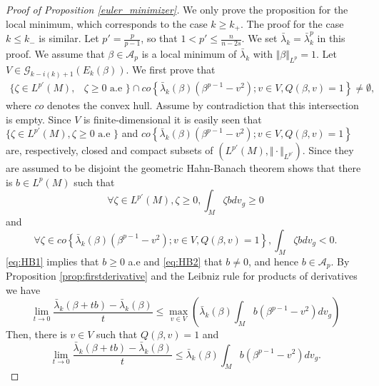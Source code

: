 \documentclass[10pt]{amsart}
\numberwithin{equation}{section}
\theoremstyle{plain}
\theoremstyle{remark}
\begin{document}
\begin{proof}[Proof of Proposition \ref{euler_minimizer}] We only prove the proposition for the local minimum, which corresponds to the case $k \ge k_+$.  The proof for the case $k \le k_{-}$ is similar. Let $p'= \frac{p}{p-1}$, so that $1 <p' \le \frac{n}{n-2s}$. We set $\bar{\lambda}_k = \bar{\lambda}_k^p$ in this proof.  We assume that $\beta \in \mathcal{A}_p$ is a local minimum of $\bar{\lambda}_k$ with $\Vert \beta \Vert_{L^p} = 1$. Let $V \in \mathcal{G}_{k-i(k)+1}(E_k(\beta))$. We first prove that
\begin{equation} \label{eq:HBnonempty}
\begin{split} \{ \zeta \in L^{p'}(M) , & \zeta \geq 0 \text{ a.e } \}  \cap   %
 co \left\{ \bar{\lambda}_k(\beta) \left( \beta^{p-1} - v^2 \right) ; v \in V, Q(\beta,v) = 1 \right\} \neq \emptyset ,
\end{split} \end{equation}
where $co$ denotes the convex hull. Assume by contradiction that this intersection is empty. Since $V$ is finite-dimensional it is easily seen that $ \{ \zeta \in L^{p'}(M) , \zeta \geq 0 \text{ a.e } \}$ and $co \left\{ \bar{\lambda}_k(\beta) \left( \beta^{p-1} - v^2 \right) ; v \in V, Q(\beta,v) = 1 \right\}$ are, respectively, closed and compact subsets of $(L^{p'}(M), \Vert \cdot \Vert_{L^{p'}})$. Since they are assumed to be disjoint the geometric Hahn-Banach theorem shows that there is $b \in L^p(M)$ such that
\begin{equation} \label{eq:HB1} \forall \zeta \in L^{p'}(M), \zeta \geq 0, \int_M \zeta b dv_g \geq 0 \end{equation}
and
\begin{equation} \label{eq:HB2} \forall \zeta \in  %
co \left\{ \bar{\lambda}_k(\beta) \left( \beta^{p-1} - v^2 \right) ; v \in V, Q(\beta,v) = 1 \right\} , \int_M \zeta b dv_g < 0. \end{equation}
\eqref{eq:HB1} implies that $b \geq 0$ a.e and \eqref{eq:HB2} that $b \neq 0$, and hence  $b \in \mathcal{A}_p$. %
By Proposition \ref{prop:firstderivative} and the Leibniz rule for products of derivatives we have
$$ \lim_{t\to 0} \frac{\bar{\lambda}_k(\beta+tb) - \bar{\lambda}_k(\beta)}{t} \leq \max_{v\in V} \left( \bar{\lambda}_k(\beta)\int_{M} b (\beta^{p-1} - v^2)dv_g \right) $$
Then, there is $v \in V$ such that $Q(\beta,v) = 1$ and 
$$ \lim_{t\to 0} \frac{\bar{\lambda}_k(\beta+tb) - \bar{\lambda}_k(\beta)}{t} \leq  \bar{\lambda}_k(\beta)\int_{M} b (\beta^{p-1} - v^2)dv_g. $$ %

\end{proof}
\end{document}
